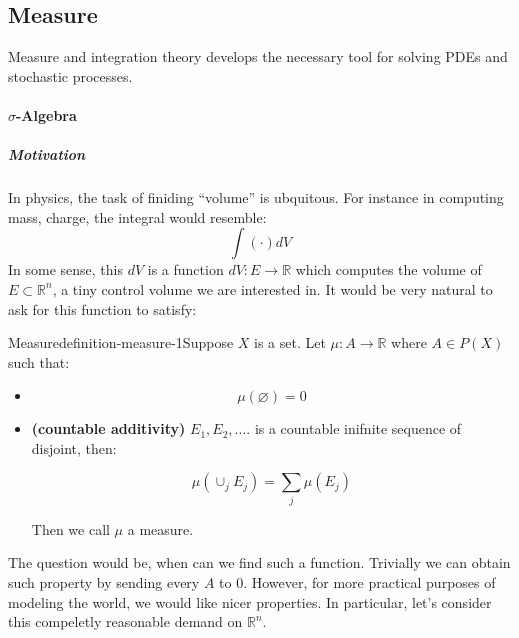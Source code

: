 \subsection{Measure}

Measure and integration theory develops the necessary tool for solving PDEs and stochastic processes.

\paragraph{$\sigma$-Algebra}

\subparagraph{Motivation}

In physics, the task of finiding ``volume'' is ubquitous. For instance in computing mass, charge, the integral would resemble:
\begin{equation}
\int (\cdot ) dV
\end{equation}
In some sense, this $dV$ is a function $dV:E\to \mathbb{R}$ which computes the volume of $E\subset \mathbb{R}^n$, a tiny control volume we are interested in.  It would be very natural to ask for this function to satisfy:

\begin{mystthmdefinition}{Measure}{definition-measure-1}Suppose $X$ is a set. Let $\mu: A \to \mathbb{R}$ where $A\in P(X)$ such that:

\begin{itemize}
\item \begin{equation}
\mu(\varnothing)=0
\end{equation}


\item \textbf{(countable additivity)} $E_1,E_2,....$ is a countable inifnite sequence of disjoint, then:

\begin{equation}
\mu(\cup_j E_j)=\sum_j \mu(E_j)
\end{equation}


Then we call $\mu$ a measure.
\end{itemize}

\end{mystthmdefinition}
The question would be, when can we find such a function. Trivially we can obtain such property by sending every $A$ to 0. However, for more practical purposes of modeling the world, we would like nicer properties. In particular, let's consider this compeletly reasonable demand on $\mathbb{R}^n$.

